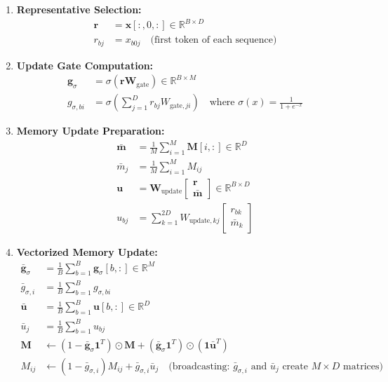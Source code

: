 \documentclass{article}
\begin{document}
\begin{enumerate}
\item \textbf{Representative Selection:}
\begin{align}
\mathbf{r} &= \mathbf{x}[:, 0, :] \in \mathbb{R}^{B \times D} \\
r_{bj} &= x_{b0j} \quad \text{(first token of each sequence)}
\end{align}

\item \textbf{Update Gate Computation:}
\begin{align}
\mathbf{g}_\sigma &= \sigma(\mathbf{r} \mathbf{W}_{\text{gate}}) \in \mathbb{R}^{B \times M} \\
g_{\sigma,bi} &= \sigma\left(\sum_{j=1}^{D} r_{bj} W_{\text{gate},ji}\right) \quad \text{where } \sigma(x) = \frac{1}{1 + e^{-x}}
\end{align}

\item \textbf{Memory Update Preparation:}
\begin{align}
\bar{\mathbf{m}} &= \frac{1}{M}\sum_{i=1}^{M} \mathbf{M}[i, :] \in \mathbb{R}^{D} \\
\bar{m}_j &= \frac{1}{M}\sum_{i=1}^{M} M_{ij} \\
\mathbf{u} &= \mathbf{W}_{\text{update}} \begin{bmatrix} \mathbf{r} \\ \bar{\mathbf{m}} \end{bmatrix} \in \mathbb{R}^{B \times D} \\
u_{bj} &= \sum_{k=1}^{2D} W_{\text{update},kj} \begin{bmatrix} r_{bk} \\ \bar{m}_k \end{bmatrix}
\end{align}

\item \textbf{Vectorized Memory Update:}
\begin{align}
\bar{\mathbf{g}}_\sigma &= \frac{1}{B}\sum_{b=1}^{B} \mathbf{g}_\sigma[b, :] \in \mathbb{R}^{M} \\
\bar{g}_{\sigma,i} &= \frac{1}{B}\sum_{b=1}^{B} g_{\sigma,bi} \\
\bar{\mathbf{u}} &= \frac{1}{B}\sum_{b=1}^{B} \mathbf{u}[b, :] \in \mathbb{R}^{D} \\
\bar{u}_j &= \frac{1}{B}\sum_{b=1}^{B} u_{bj} \\
\mathbf{M} &\leftarrow (1 - \bar{\mathbf{g}}_\sigma \mathbf{1}^T) \odot \mathbf{M} + (\bar{\mathbf{g}}_\sigma \mathbf{1}^T) \odot (\mathbf{1} \bar{\mathbf{u}}^T) \\
M_{ij} &\leftarrow (1 - \bar{g}_{\sigma,i}) M_{ij} + \bar{g}_{\sigma,i} \bar{u}_j \quad \text{(broadcasting: $\bar{g}_{\sigma,i}$ and $\bar{u}_j$ create $M \times D$ matrices)}
\end{align}


\end{enumerate}
\end{document}
